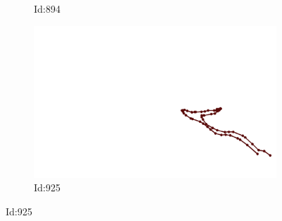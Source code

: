 \documentclass[12pt,twoside]{report}
\begin{document}
\begin{figure}
\begin{subfigure}[b]{0.20\textwidth}
\caption{Id:894}
\end{subfigure}
\begin{subfigure}[b]{0.20\textwidth}
\centering
\includegraphics[width=\textwidth]{../../trajectories/925.png}
\caption{Id:925}
\end{subfigure}
\end{figure}
\end{document}
